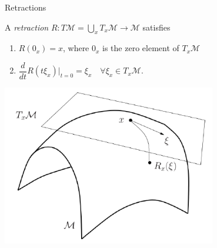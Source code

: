 \documentclass[xcolor=dvipsnames,t]{beamer} %
\newcommand{\diff}[2]{\dfrac{d #1}{d #2}}
\begin{document}
\begin{frame}{Retractions}
   
   A \emph{retraction} $R:T\mathcal{M}=\bigcup_x T_x\mathcal{M}\to\mathcal{M}$ satisfies
   \begin{enumerate}[1.]
      \item $R(0_x) = x$, where $0_x$ is the zero element of $T_x\mathcal{M}$
      \item $\diff{}{t}R(t\xi_x)\biggr|_{t=0} = \xi_x \quad \forall \xi_x\in T_x\mathcal{M}$.
   \end{enumerate}
   

      
   \begin{center}
      \includegraphics[width=0.7\textwidth]{figures/retraction.pdf}
   \end{center}
\end{frame}
\end{document}
